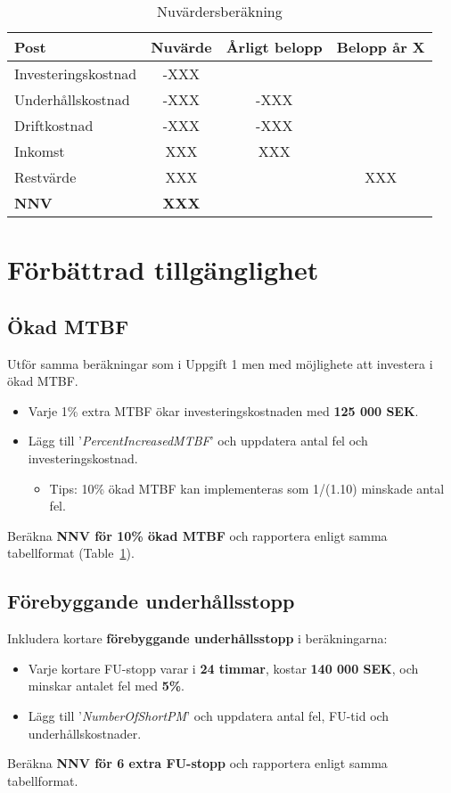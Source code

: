 \documentclass[a4paper,12pt]{exam}
\begin{document}
\begin{table}[h]
    \centering
    \begin{tabular}{lccc}
        \toprule
        \textbf{Post} & \textbf{Nuvärde} & \textbf{Årligt belopp} & \textbf{Belopp år X} \\
        \midrule
        Investeringskostnad & -XXX &  &  \\
        Underhållskostnad & -XXX & -XXX &  \\
        Driftkostnad & -XXX & -XXX &  \\
        Inkomst & XXX & XXX &  \\
        Restvärde & XXX &  &  XXX\\
        \textbf{NNV} & \textbf{XXX} &  &  \\
        \bottomrule
    \end{tabular}
    \caption{Nuvärdersberäkning}
    \label{NPVtable}
\end{table}


\section{Förbättrad tillgänglighet}
\subsection{Ökad MTBF}
Utför samma beräkningar som i Uppgift 1 men med möjlighete att investera i ökad MTBF. 
\begin{itemize}
    \item Varje 1\% extra MTBF ökar investeringskostnaden med \textbf{125 000 SEK}. 
    \item Lägg till '\emph{PercentIncreasedMTBF}' och uppdatera antal fel och investeringskostnad.
    \begin{itemize}
        \item Tips: 10\% ökad MTBF kan implementeras som 1/(1.10) minskade antal fel.
    \end{itemize}
\end{itemize}
Beräkna \textbf{NNV för 10\% ökad MTBF} och rapportera enligt samma tabellformat (Table~\ref{NPVtable}).

\subsection{Förebyggande underhållsstopp}
Inkludera kortare \textbf{förebyggande underhållsstopp} i beräkningarna:
\begin{itemize}
    \item Varje kortare FU-stopp varar i \textbf{24 timmar}, kostar \textbf{140 000 SEK}, och minskar antalet fel med \textbf{5\%}.
    \item Lägg till '\emph{NumberOfShortPM}' och uppdatera antal fel, FU-tid och underhållskostnader.    
\end{itemize}
Beräkna \textbf{NNV för 6 extra FU-stopp} och rapportera enligt samma tabellformat.
\end{document}
